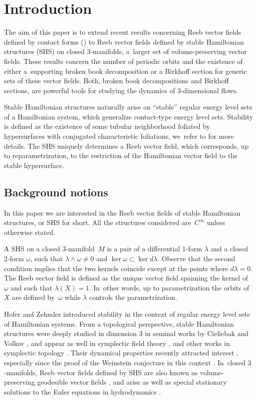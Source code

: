 \documentclass[11pt]{article}
\newcommand{\threemanifold}{$3$\nobreakdash-mani\-fold\xspace}
\newcommand{\threemanifolds}{$3$\nobreakdash-mani\-folds\xspace}
\theoremstyle{definition}
\begin{document}
\section{Introduction}\label{sec:intro}

The aim of this paper is to extend recent results concerning Reeb vector fields defined by contact forms (\cite{CDR,CDHR,CM}) to Reeb vector fields defined by stable Hamiltonian structures (SHS) on closed \threemanifolds, a~larger set of volume-preserving vector fields. These results concern the number of periodic orbits and the existence of either a~supporting broken book decomposition or a Birkhoff section for generic sets of these vector fields. Both, broken book decompositions and Birkhoff sections, are powerful tools for studying the dynamics of 3-dimensional flows.

Stable Hamiltonian structures naturally arise on ``stable'' regular energy level sets of a Hamiltonian system, which generalize contact-type energy level sets. Stability is defined as the existence of some tubular neighborhood foliated by hypersurfaces with conjugated characteristic foliations, we~refer to \cite{HZ,CV1} for more details. The SHS uniquely determines a Reeb vector field, which corresponds, up to reparametrization, to the restriction of the Hamiltonian vector field to the stable hypersurface.

\subsection{Background notions}
In this paper we are interested in the Reeb vector fields of stable Hamiltonian structures, or SHS for short. All the structures considered are~$C^\infty$ unless otherwise stated.

A SHS on a closed \threemanifold~$M$ is a pair of a differential $1$-form $\lambda$ and a closed 2-form $\omega$, such that $\lambda\wedge \omega\neq 0$ and $\ker \omega\subset \ker d\lambda$. Observe that the second condition implies that the two kernels coincide except at the points where $d\lambda=0$. The Reeb vector field is defined as the unique vector field spanning the kernel of $\omega$ and such that $\lambda(X)=1$. In~other words, up to parametrization the orbits of $X$ are defined by~$\omega$ while $\lambda$ controls the parametrization.

Hofer and Zehnder \cite{HZ} introduced stability in the context of regular energy level sets of Hamiltonian systems. From a topological perspective, stable Hamiltonian structures were deeply studied in dimension 3 in seminal works by Cieliebak and Volkov \cite{CV0, CV1}, and appear as well in symplectic field theory \cite{EGH, BEHWZ, CiMo}, and other works in symplectic topology \cite{EKP, W1, LW, NW, MNW,MS}. Their dynamical properties recently attracted interest \cite{CFP1,CFP2, MP, CV2, C}, especially since the proof of the Weinstein conjecture in this context \cite{HT, Re}. In~closed \threemanifolds, Reeb vector fields defined by SHS are also known as volume-preserving geodesible vector fields \cite{Re}, and arise as well as special stationary solutions to the Euler equations in hydrodynamics \cite{CV1}.
\end{document}
